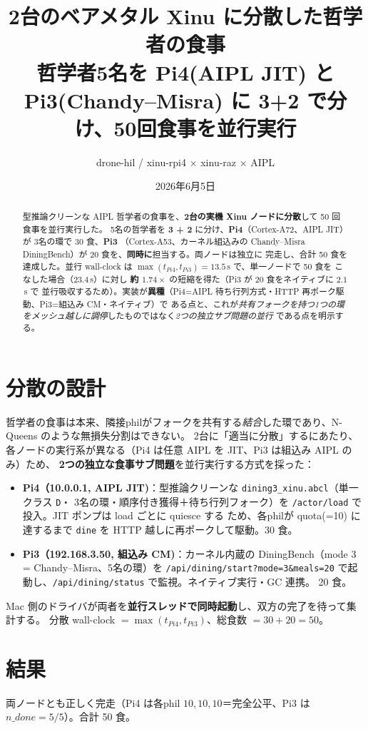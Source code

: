 \documentclass[11pt]{ltjsarticle}
\title{\textbf{2台のベアメタル Xinu に分散した哲学者の食事}\\
\large 哲学者5名を Pi4(AIPL JIT) と Pi3(Chandy--Misra) に 3+2 で分け、50回食事を並行実行}
\author{drone-hil / xinu-rpi4 $\times$ xinu-raz $\times$ AIPL}
\date{2026年6月5日}
\begin{document}
\maketitle

\begin{abstract}
型推論クリーンな AIPL 哲学者の食事を、\textbf{2台の実機 Xinu ノードに分散}して 50 回食事を並行実行した。
5名の哲学者を \textbf{3 + 2} に分け、\textbf{Pi4}（Cortex-A72、AIPL JIT）が 3名の環で 30 食、\textbf{Pi3}
（Cortex-A53、カーネル組込みの Chandy--Misra DiningBench）が 20 食を、\textbf{同時に}担当する。両ノードは独立に
完走し、合計 50 食を達成した。並行 wall-clock は $\max(t_{Pi4}, t_{Pi3}) = 13.5$\,s で、単一ノードで 50 食を
こなした場合（$23.4$\,s）に対し \textbf{約 $1.74\times$} の短縮を得た（Pi3 が 20 食をネイティブに $2.1$\,s で
並行吸収するため）。実装が\textbf{異種}（Pi4=AIPL 待ち行列方式・HTTP 再ポーク駆動、Pi3=組込み CM・ネイティブ）で
ある点と、これが\emph{共有フォークを持つ1つの環をメッシュ越しに調停}したものではなく\emph{2つの独立サブ問題の並行}
である点を明示する。
\end{abstract}

\section{分散の設計}
哲学者の食事は本来、隣接philがフォークを共有する\emph{結合}した環であり、N-Queens のような無損失分割はできない。
2台に「適当に分散」するにあたり、各ノードの実行系が異なる（Pi4 は任意 AIPL を JIT、Pi3 は組込み AIPL のみ）ため、
\textbf{2つの独立な食事サブ問題}を並行実行する方式を採った：
\begin{itemize}
  \item \textbf{Pi4（10.0.0.1, AIPL JIT)}：型推論クリーンな \texttt{dining3\_xinu.abcl}（単一クラス \texttt{D}・
  3名の環・順序付き獲得＋待ち行列フォーク）を \texttt{/actor/load} で投入。JIT ポンプは load ごとに quiesce する
  ため、各philが quota(=10) に達するまで \texttt{dine} を HTTP 越しに再ポークして駆動。30 食。
  \item \textbf{Pi3（192.168.3.50, 組込み CM)}：カーネル内蔵の DiningBench（mode 3 = Chandy--Misra、5名の環）を
  \texttt{/api/dining/start?mode=3\&meals=20} で起動し、\texttt{/api/dining/status} で監視。ネイティブ実行・GC 連携。
  20 食。
\end{itemize}
Mac 側のドライバが両者を\textbf{並行スレッドで同時起動}し、双方の完了を待って集計する。
分散 wall-clock $= \max(t_{Pi4}, t_{Pi3})$、総食数 $= 30 + 20 = 50$。

\section{結果}
両ノードとも正しく完走（Pi4 は各phil $10,10,10$＝完全公平、Pi3 は $n\_done=5/5$）。合計 50 食。
\end{document}

